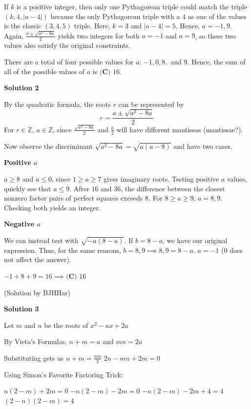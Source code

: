 \begin{enumerate}
 If $k$ is a positive integer, then only one Pythagorean triple could match the triple $(k,4,|a - 4|)$ because the only Pythagorean triple with a $4$ as one of the values is the classic $(3,4,5)$ triple. Here, $k=3$ and $|a-4|=5$. Hence, $a=-1,9$. Again, $\frac{a\pm\sqrt{a^2-8a}}{2}$ yields two integers for both $a=-1$ and $a=9$, so these two values also satisfy the original constraints.

 There are a total of four possible values for $a$: $-1,0,8,$ and $9$. Hence, the sum of all of the possible values of $a$ is $\boxed{\textbf{(C) }16}$.

 


 



\textbf{Solution 2}

By the quadratic formula, the roots $r$ can be represented by
 \[r=\frac{a\pm\sqrt{a^2-8a}}{2}\]For $r\in\mathbb{Z}$, $a\in\mathbb{Z}$, since $\frac{\sqrt{a^2-8a}}{2}$ and $\frac{a}{2}$ will have different mantissas (mantissae?). 

 Now observe the discriminant $\sqrt{a^2-8a}=\sqrt{a(a-8)}$ and have two cases.

 
\textbf{Positive $a$}

 $a\geq8$ and $a\leq0$, since $1\geq a \geq7$ gives imaginary roots. Testing positive $a$ values, quickly see that $a\leq9$. After $16$ and $36$, the difference between the closest nonzero factor pairs of perfect squares exceeds $8$. For $8\geq a \geq9$, $a=8,9$. Checking both yields an integer.

 \textbf{Negative $a$}

 We can instead test with $\sqrt{-a(8-a)}$. If $b=8-a$, we have our original expression. Thus, for the same reasons, $b=8,9\implies 8,9=8-a$. $a=-1$ (0 does not affect the answer).

 
$-1+8+9=16\implies\boxed{\textbf{(C) }16}$

 
(Solution by BJHHar)

 



\textbf{Solution 3}

Let $m$ and $n$ be the roots of $x^2-ax+2a$

 By Vieta's Formulas, $n+m=a$ and $mn=2a$

 Substituting gets us $n+m=\frac{mn}{2}$
$2n-mn+2m=0$

 Using Simon's Favorite Factoring Trick:

 $n(2-m)+2m=0$
$-n(2-m)-2m=0$
$-n(2-m)-2m+4=4$
$(2-n)(2-m)=4$


\end{enumerate}
